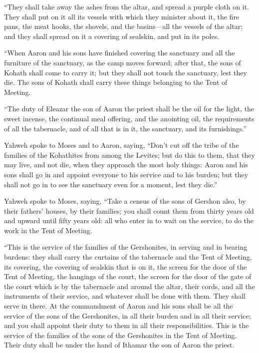  ``They shall take away the ashes from the altar, and
spread a purple cloth on it.  They shall put on it all
its vessels with which they minister about it, the fire pans, the meat
hooks, the shovels, and the basins---all the vessels of the altar; and
they shall spread on it a covering of sealskin, and put in its poles.

 ``When Aaron and his sons have finished covering the
sanctuary and all the furniture of the sanctuary, as the camp moves
forward; after that, the sons of Kohath shall come to carry it; but they
shall not touch the sanctuary, lest they die. The sons of Kohath shall
carry these things belonging to the Tent of Meeting.

 ``The duty of Eleazar the son of Aaron the priest shall
be the oil for the light, the sweet incense, the continual meal
offering, and the anointing oil, the requirements of all the tabernacle,
and of all that is in it, the sanctuary, and its furnishings.''

 Yahweh spoke to Moses and to Aaron, saying,
 ``Don't cut off the tribe of the families of the
Kohathites from among the Levites;  but do this to them,
that they may live, and not die, when they approach the most holy
things: Aaron and his sons shall go in and appoint everyone to his
service and to his burden;  but they shall not go in to
see the sanctuary even for a moment, lest they die.''

 Yahweh spoke to Moses, saying,  ``Take a
census of the sons of Gershon also, by their fathers' houses, by their
families;  you shall count them from thirty years old and
upward until fifty years old: all who enter in to wait on the service,
to do the work in the Tent of Meeting.

 ``This is the service of the families of the
Gershonites, in serving and in bearing burdens:  they
shall carry the curtains of the tabernacle and the Tent of Meeting, its
covering, the covering of sealskin that is on it, the screen for the
door of the Tent of Meeting,  the hangings of the court,
the screen for the door of the gate of the court which is by the
tabernacle and around the altar, their cords, and all the instruments of
their service, and whatever shall be done with them. They shall serve in
there.  At the commandment of Aaron and his sons shall be
all the service of the sons of the Gershonites, in all their burden and
in all their service; and you shall appoint their duty to them in all
their responsibilities.  This is the service of the
families of the sons of the Gershonites in the Tent of Meeting. Their
duty shall be under the hand of Ithamar the son of Aaron the priest.

